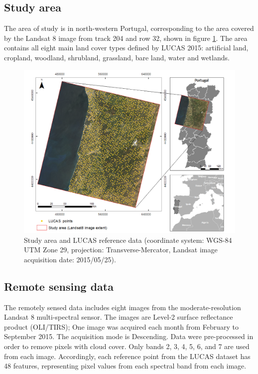 \documentclass[remotesensing,article,submit,moreauthors,pdftex]{Definitions/mdpi}
\begin{document}
\subsection{Study area}

The area of study is in north-western Portugal, corresponding to the area
covered by the Landsat 8 image from track 204 and row 32, shown in figure
\ref{fig:studyarea}. The area contains all eight  main land cover types defined
by LUCAS 2015: artificial land, cropland, woodland, shrubland, grassland, bare
land, water and wetlands.

\begin{figure}[H]
	\centering
	\includegraphics[width=1\linewidth]{../analysis/study_area}
	\caption{Study area and LUCAS reference data (coordinate system:
		WGS-84 UTM Zone 29, projection: Transverse-Mercator, Landsat image
		acquisition date: 2015/05/25).}
	\label{fig:studyarea}
\end{figure}

\subsection{Remote sensing data}

The remotely sensed data includes eight images from the moderate-resolution
Landsat  8 multi-spectral sensor. The images are Level-2 surface reflectance
product (OLI/TIRS); One image was acquired each month from February to
September 2015. The acquisition mode is Descending. Data were pre-processed
in order to remove pixels with cloud cover. Only bands 2, 3, 4, 5, 6, and 7
are used from each image. Accordingly, each reference point from the LUCAS
dataset has 48 features, representing pixel values from each spectral band
from each image.
\end{document}
